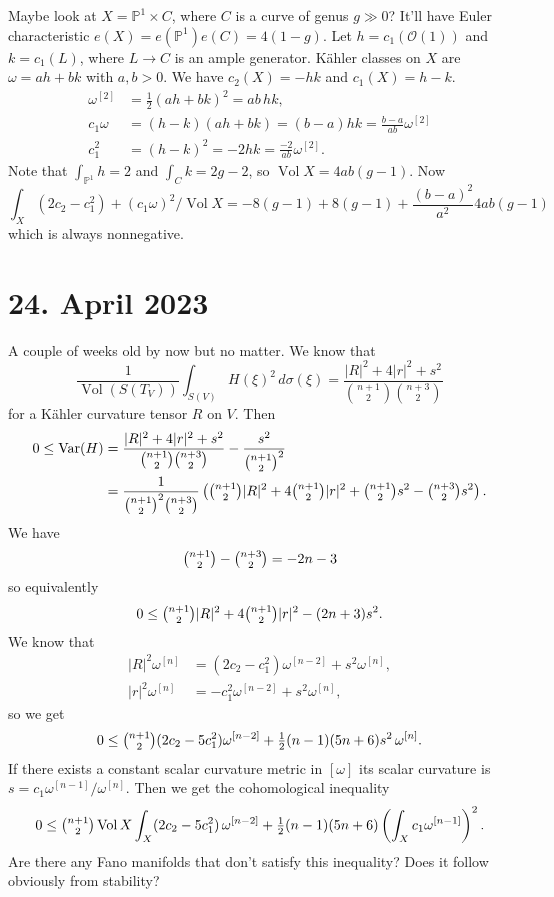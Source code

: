 \documentclass[11pt]{article}
\theoremstyle{definition}
\newcommand{\kk}[1]{\mathbb{#1}}
\def\^#1{^{[#1]}}
\DeclareMathOperator{\Vol}{Vol}
\begin{document}
Maybe look at $X = \kk P^1 \times C$, where $C$ is a curve of genus $g \gg 0$?
It'll have Euler characteristic $e(X) = e(\kk P^1) e(C) = 4(1-g)$.
Let $h = c_1(\mathcal O(1))$ and $k = c_1(L)$, where $L \to C$ is an ample generator.
K\"ahler classes on $X$ are $\omega = ah + bk$ with $a, b > 0$.
We have $c_2(X) = -hk$ and $c_1(X) = h - k$.
\begin{align*}
\omega\^2 &=\tfrac12 (ah + bk)^2 = ab \, hk,
\\
c_1 \omega &= (h-k)(ah + bk) = (b - a) hk = \frac{b-a}{ab} \omega\^2
\\
c_1^2 &= (h-k)^2 = -2 hk = \frac{-2}{ab} \omega\^2.
\end{align*}
Note that $\int_{\kk P^1} h = 2$ and $\int_{C} k = 2g-2$, so $\Vol X = 4ab(g-1)$.
Now
$$
\int_X(2c_2 - c_1^2) + (c_1 \omega)^2 / \Vol X
= -8(g-1) + 8(g-1) + \frac{(b-a)^2}{a^2} 4ab(g-1)
$$
which is always nonnegative.


\section{24. April 2023}

A couple of weeks old by now but no matter.
We know that
$$
\frac{1}{\Vol(S(T_V))} \int_{S(V)} H(\xi)^2 \, d\sigma(\xi)
= \frac{|R|^2 + 4|r|^2 + s^2}{\binom{n+1}{2}\binom{n+3}{2}}
$$
for a K\"ahler curvature tensor $R$ on $V$.
Then
\begin{align*}
0
\leq \operatorname{Var}(H)
&=
\frac{|R|^2 + 4|r|^2 + s^2}{\binom{n+1}{2}\binom{n+3}{2}}
- \frac{s^2}{\binom{n+1}{2}^2}
\\
&= \frac{1}{\binom{n+1}{2}^2\binom{n+3}{2}}
\left(
\tbinom{n+1}{2} |R|^2
+ 4\tbinom{n+1}{2} |r|^2
+ \tbinom{n+1}{2} s^2
- \tbinom{n+3}{2} s^2
\right).
\end{align*}
We have
$$
\tbinom{n+1}{2}
- \tbinom{n+3}{2}
= -2n - 3
$$
so equivalently
$$
0 \leq
\tbinom{n+1}{2} |R|^2
+ 4\tbinom{n+1}{2} |r|^2
- (2n+3) s^2.
$$
We know that
\begin{align*}
|R|^2 \omega\^{n}
&= (2c_2 - c_1^2) \omega\^{n-2} + s^2 \omega\^n,
\\
|r|^2 \omega\^{n}
&= -c_1^2 \omega\^{n-2} + s^2 \omega\^n,
\end{align*}
so we get
$$
0
\leq
\tbinom{n+1}{2} (2c_2 - 5c_1^2) \omega\^{n-2}
+ \tfrac12 (n-1)(5n+6) s^2 \, \omega\^n.
$$
If there exists a constant scalar curvature metric in $[\omega]$ its scalar
curvature is $s = c_1 \omega\^{n-1} / \omega\^n$.
Then we get the cohomological inequality
$$
0
\leq
\tbinom{n+1}{2}
\Vol X
\int_X (2c_2 - 5c_1^2) \, \omega\^{n-2}
+ \tfrac12 (n-1)(5n+6)
\left(
\int_X c_1 \omega\^{n-1}
\right)^2.
$$
Are there any Fano manifolds that don't satisfy this inequality?
Does it follow obviously from stability?
\end{document}
